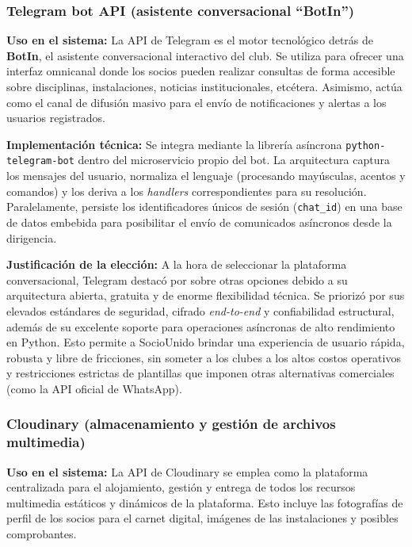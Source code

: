 \subsubsection{Telegram bot API (asistente conversacional ``BotIn'')}

\textbf{Uso en el sistema:} La API de Telegram es el motor tecnológico detrás de \textbf{BotIn}, el asistente conversacional interactivo del club. Se utiliza para ofrecer una interfaz omnicanal donde los socios pueden realizar consultas de forma accesible sobre disciplinas, instalaciones, noticias institucionales, etcétera. Asimismo, actúa como el canal de difusión masivo para el envío de notificaciones y alertas a los usuarios registrados.

\textbf{Implementación técnica:} Se integra mediante la librería asíncrona \texttt{python-telegram-bot} dentro del microservicio propio del bot. La arquitectura captura los mensajes del usuario, normaliza el lenguaje (procesando mayúsculas, acentos y comandos) y los deriva a los \textit{handlers} correspondientes para su resolución. Paralelamente, persiste los identificadores únicos de sesión (\texttt{chat\_id}) en una base de datos embebida para posibilitar el envío de comunicados asíncronos desde la dirigencia.

\textbf{Justificación de la elección:} A la hora de seleccionar la plataforma conversacional, Telegram destacó por sobre otras opciones debido a su arquitectura abierta, gratuita y de enorme flexibilidad técnica. Se priorizó por sus elevados estándares de seguridad, cifrado \textit{end-to-end} y confiabilidad estructural, además de su excelente soporte para operaciones asíncronas de alto rendimiento en Python. Esto permite a SocioUnido brindar una experiencia de usuario rápida, robusta y libre de fricciones, sin someter a los clubes a los altos costos operativos y restricciones estrictas de plantillas que imponen otras alternativas comerciales (como la API oficial de WhatsApp).

\subsubsection{Cloudinary (almacenamiento y gestión de archivos multimedia)}

\textbf{Uso en el sistema:} La API de Cloudinary se emplea como la plataforma centralizada para el alojamiento, gestión y entrega de todos los recursos multimedia estáticos y dinámicos de la plataforma. Esto incluye las fotografías de perfil de los socios para el carnet digital, imágenes de las instalaciones y posibles comprobantes.

